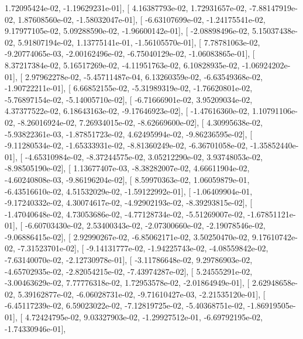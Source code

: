 \documentclass{article}
\begin{document}
          1.72095424e-02,  -1.19629231e-01],
       [  4.16387793e-02,   1.72931657e-02,  -7.88147919e-02,
          1.87608560e-02,  -1.58032047e-01],
       [ -6.63107699e-02,  -1.24175541e-02,   9.17977105e-02,
          5.09288590e-02,  -1.96600142e-01],
       [ -2.08898496e-02,   5.15037438e-02,   5.91807194e-02,
          1.13775141e-01,  -1.56105570e-01],
       [  7.78781063e-02,  -9.20774065e-03,  -2.00162496e-02,
         -6.75040129e-02,  -1.06083865e-01],
       [  8.37217384e-02,   5.16517269e-02,  -4.11951763e-02,
          6.10828935e-02,  -1.06924202e-01],
       [  2.97962278e-02,  -5.45711487e-04,   6.13260359e-02,
         -6.63549368e-02,  -1.90722211e-01],
       [  6.66852155e-02,  -5.31989319e-02,  -1.76620801e-02,
         -5.76897154e-02,  -5.14005710e-02],
       [ -6.71666901e-02,   3.95209034e-02,   4.37377522e-02,
          6.18643163e-02,  -9.17646923e-02],
       [ -1.47616360e-02,   1.10791106e-02,  -8.26016924e-02,
          7.26934015e-02,  -8.62669600e-02],
       [  4.30995638e-02,  -5.93822361e-03,  -1.87851723e-02,
          4.62495994e-02,  -9.86236595e-02],
       [ -9.11280534e-02,  -1.65333931e-02,  -8.81360249e-02,
         -6.36701058e-02,  -1.35852440e-01],
       [ -4.65310984e-02,  -8.37244575e-02,   3.05212290e-02,
          3.93748053e-02,  -8.98505190e-02],
       [  1.13677407e-03,  -8.38282007e-02,   4.66611904e-02,
         -4.60240808e-03,  -9.86196204e-02],
       [  8.59970363e-02,   1.06059879e-01,  -6.43516610e-02,
          4.51532029e-02,  -1.59122992e-01],
       [ -1.06409904e-01,  -9.17240332e-02,   4.30074617e-02,
         -4.92902193e-02,  -8.39293815e-02],
       [ -1.47040648e-02,   4.73053686e-02,  -4.77128734e-02,
         -5.51269007e-02,  -1.67851121e-01],
       [ -6.60703430e-02,   2.53400343e-02,  -2.07300660e-02,
         -2.19078546e-02,  -9.06886415e-02],
       [  2.92990267e-02,  -6.85062171e-02,   3.50250470e-02,
          9.17610742e-02,  -7.31523701e-02],
       [ -9.14131777e-02,  -1.94225743e-02,  -4.08559842e-02,
         -7.63140070e-02,  -2.12730978e-01],
       [ -3.11786648e-02,   9.29786903e-02,  -4.65702935e-02,
         -2.82054215e-02,  -7.43974287e-02],
       [  5.24555291e-02,  -3.00463629e-02,   7.77776318e-02,
          1.72953578e-02,  -2.01864949e-01],
       [  2.62948658e-02,   5.39162877e-02,  -6.06028731e-02,
         -9.71610427e-03,  -2.21535120e-01],
       [ -6.45117239e-02,   6.59023022e-02,  -7.12819725e-02,
         -5.40368751e-02,  -1.86919505e-01],
       [  4.72424795e-02,   9.03327903e-02,  -1.29927512e-01,
         -6.69792195e-02,  -1.74330946e-01],
\end{document}
